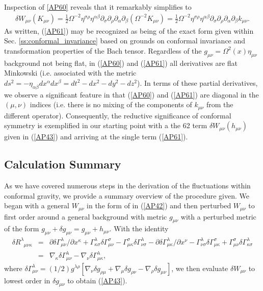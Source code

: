 %
Inspection of \eqref{AP60} reveals that it remarkably simplifies to
%
\begin{eqnarray}
\delta W_{\mu\nu}(K_{\mu\nu})=\frac{1}{2}\Omega^{-2}\eta^{\sigma\rho}\eta^{\alpha\beta}\partial_{\sigma}\partial_{\rho} \partial_{\alpha}\partial_{\beta}(\Omega^{-2}K_{\mu\nu})
=\frac{1}{2}\Omega^{-2}\eta^{\sigma\rho}\eta^{\alpha\beta}\partial_{\sigma}\partial_{\rho} \partial_{\alpha}\partial_{\beta}k_{\mu\nu}.
\label{AP61}
\end{eqnarray}
%
As written, (\ref{AP61}) may be recognized as being of the exact form given within Sec. \ref{ss:conformal_invariance} based on grounds on conformal invariance and transformation properties of the Bach tensor. Regardless of the $g_{\mu\nu}=\Omega^2(x)\eta_{\mu\nu}$ background not being flat, in (\ref{AP60}) and (\ref{AP61}) all derivatives are flat Minkowski (i.e. associated with the metric $ds^2=-\eta_{\alpha\beta}dx^{\alpha}dx^{\beta}=dt^2-dx^2-dy^2-dz^2$). In terms of these partial derivatives, we observe a significant feature in that (\ref{AP60}) and (\ref{AP61}) are diagonal in the $(\mu,\nu)$ indices (i.e. there is no mixing of the components of $k_{\mu\nu}$ from the different operator).  Consequently, the reductive significance of conformal symmetry is exemplified in our starting point with a the 62 term $\delta W_{\mu\nu}(h_{\mu\nu})$ given in (\ref{AP43}) and arriving at the single term (\ref{AP61}).

\subsection{Calculation Summary}
\label{ss:summary_cgauge}

As we have covered numerous steps in the derivation of the fluctuations within conformal gravity, we provide a summary overview of the procedure given. We began with a general $W_{\mu\nu}$ in the form of in (\ref{AP42}) and then perturbed $W_{\mu\nu}$ to first order around a general background  with metric $g_{\mu\nu}$ with a perturbed metric of the form  $g_{\mu\nu}+\delta g_{\mu\nu}=g_{\mu\nu}+h_{\mu\nu}$. With the identity 
%
\begin{eqnarray}
\delta R^{\lambda}_{\phantom{\lambda}\mu\nu\kappa}&=&
\partial \delta\Gamma^{\lambda}_{\mu\nu}/\partial x^{\kappa}
+\Gamma^{\lambda}_{\kappa\sigma}\delta\Gamma^{\sigma}_{\mu\nu}
-\Gamma^{\sigma}_{\mu\kappa}\delta\Gamma^{\lambda}_{\nu\sigma}
-\partial \delta\Gamma^{\lambda}_{\mu\kappa}/\partial x^{\nu}
-\Gamma^{\lambda}_{\nu\sigma}\delta\Gamma^{\sigma}_{\mu\kappa}
+\Gamma^{\sigma}_{\mu\nu}\delta\Gamma^{\lambda}_{\kappa\sigma}
\nonumber\\
&=&
\nabla_{\kappa}\delta\Gamma^{\lambda}_{\mu\nu}
-\nabla_{\nu}\delta\Gamma^{\lambda}_{\mu\kappa},
\end{eqnarray}
%
where $\delta\Gamma^{\lambda}_{\mu\nu}=(1/2)g^{\lambda \rho}[\nabla_{\nu}\delta g_{\rho\mu}+\nabla_{\mu}\delta g_{\rho\nu}-\nabla_{\rho}\delta g_{\mu\nu}]$, we then evaluate $\delta W_{\mu\nu}$ to lowest order in $\delta g_{\mu\nu}$ to obtain (\ref{AP43}). 

